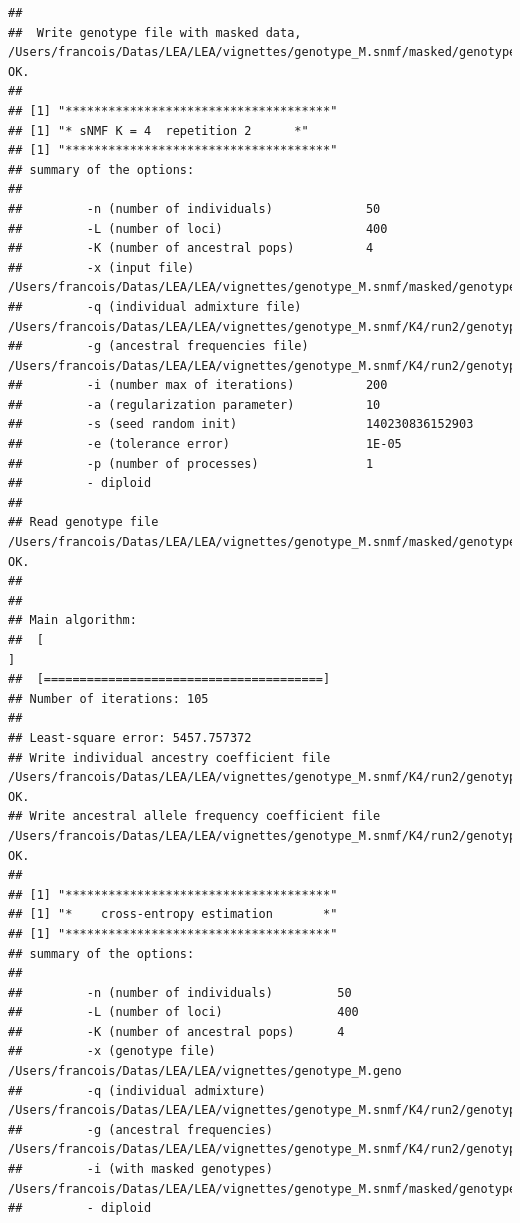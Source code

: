 \documentclass[12pt,a4paper,oneside]{article}\usepackage[]{graphicx}\usepackage[]{color}
\makeatletter
\newenvironment{kframe}{%
 \def\at@end@of@kframe{}%
 \ifinner\ifhmode%
  \def\at@end@of@kframe{\end{minipage}}%
  \begin{minipage}{\columnwidth}%
 \fi\fi%
 \def\FrameCommand##1{\hskip\@totalleftmargin \hskip-\fboxsep
 \colorbox{shadecolor}{##1}\hskip-\fboxsep
     \hskip-\linewidth \hskip-\@totalleftmargin \hskip\columnwidth}%
 \MakeFramed {\advance\hsize-\width
   \@totalleftmargin\z@ \linewidth\hsize
   \@setminipage}}%
 {\par\unskip\endMakeFramed%
 \at@end@of@kframe}
\newenvironment{knitrout}{}{} %
\makeatother
\begin{document}
\begin{knitrout}
\begin{kframe}
\begin{verbatim}
## 
##  Write genotype file with masked data, /Users/francois/Datas/LEA/LEA/vignettes/genotype_M.snmf/masked/genotype_M_I.geno:		OK.
## 
## [1] "*************************************"
## [1] "* sNMF K = 4  repetition 2      *"
## [1] "*************************************"
## summary of the options:
## 
##         -n (number of individuals)             50
##         -L (number of loci)                    400
##         -K (number of ancestral pops)          4
##         -x (input file)                        /Users/francois/Datas/LEA/LEA/vignettes/genotype_M.snmf/masked/genotype_M_I.geno
##         -q (individual admixture file)         /Users/francois/Datas/LEA/LEA/vignettes/genotype_M.snmf/K4/run2/genotype_M_r2.4.Q
##         -g (ancestral frequencies file)        /Users/francois/Datas/LEA/LEA/vignettes/genotype_M.snmf/K4/run2/genotype_M_r2.4.G
##         -i (number max of iterations)          200
##         -a (regularization parameter)          10
##         -s (seed random init)                  140230836152903
##         -e (tolerance error)                   1E-05
##         -p (number of processes)               1
##         - diploid
## 
## Read genotype file /Users/francois/Datas/LEA/LEA/vignettes/genotype_M.snmf/masked/genotype_M_I.geno:		OK.
## 
## 
## Main algorithm:
## 	[                                                                           ]
## 	[=======================================]
## Number of iterations: 105
## 
## Least-square error: 5457.757372
## Write individual ancestry coefficient file /Users/francois/Datas/LEA/LEA/vignettes/genotype_M.snmf/K4/run2/genotype_M_r2.4.Q:		OK.
## Write ancestral allele frequency coefficient file /Users/francois/Datas/LEA/LEA/vignettes/genotype_M.snmf/K4/run2/genotype_M_r2.4.G:	OK.
## 
## [1] "*************************************"
## [1] "*    cross-entropy estimation       *"
## [1] "*************************************"
## summary of the options:
## 
##         -n (number of individuals)         50
##         -L (number of loci)                400
##         -K (number of ancestral pops)      4
##         -x (genotype file)                 /Users/francois/Datas/LEA/LEA/vignettes/genotype_M.geno
##         -q (individual admixture)          /Users/francois/Datas/LEA/LEA/vignettes/genotype_M.snmf/K4/run2/genotype_M_r2.4.Q
##         -g (ancestral frequencies)         /Users/francois/Datas/LEA/LEA/vignettes/genotype_M.snmf/K4/run2/genotype_M_r2.4.G
##         -i (with masked genotypes)         /Users/francois/Datas/LEA/LEA/vignettes/genotype_M.snmf/masked/genotype_M_I.geno
##         - diploid

\end{verbatim}
\end{kframe}
\end{knitrout}
\end{document}
